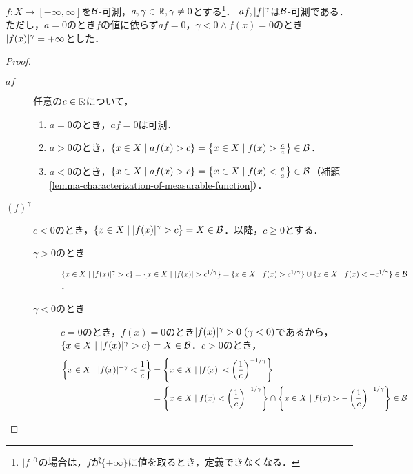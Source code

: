 \documentclass[uplatex, dvipdfmx]{jsreport}
\begin{document}
\begin{proposition}[斉次性]\label{prop-measurable-function-closed-uunder-scaling-and-power}
    $f:X\to[-\infty,\infty]$を$\mathcal{B}$-可測，$a,\gamma\in\mathbb{R},\gamma\ne 0$とする\footnote{$\lvert f\rvert^0$の場合は，$f$が$\{\pm\infty\}$に値を取るとき，定義できなくなる．}．
    $af,\lvert f\rvert^\gamma$は$\mathcal{B}$-可測である．
    ただし，$a=0$のとき$f$の値に依らず$af=0$，$\gamma<0\land f(x)=0$のとき$\lvert f(x)\rvert^\gamma=+\infty$とした．
\end{proposition}
\begin{proof}\mbox{}
    \begin{description}
        \item[$af$] 任意の$c\in\mathbb{R}$について，\begin{enumerate}
            \item $a=0$のとき，$af=0$は可測．
            \item $a>0$のとき，$\{x\in X\mid af(x)>c\}=\left\{x\in X\mid f(x)>\frac{c}{a}\right\}\in\mathcal{B}$．
            \item $a<0$のとき，$\{x\in X\mid af(x)>c\}=\left\{x\in X\mid f(x)<\frac{c}{a}\right\}\in\mathcal{B}$（補題\ref{lemma-characterization-of-measurable-function}）．
        \end{enumerate}
        \item[$(f)^\gamma$] $c<0$のとき，$\{x\in X\mid \lvert f(x)\rvert^\gamma>c\}=X\in\mathcal{B}$．以降，$c\ge 0$とする．
        \begin{description}
            \item[$\gamma>0$のとき] $\{x\in X\mid \lvert f(x)\rvert^\gamma>c\}=\{x\in X\mid \lvert f(x)\rvert>c^{1/\gamma}\}=\{x\in X\mid f(x)>c^{1/\gamma}\}\cup\{x\in X\mid f(x)<-c^{1/\gamma}\}\in\mathcal{B}$．
            \item[$\gamma<0$のとき] $c=0$のとき，$f(x)=0$のとき$\lvert f(x)\rvert^\gamma>0\;(\gamma<0)$であるから，$\{x\in X\mid \lvert f(x)\rvert^\gamma>c\}=X\in\mathcal{B}$．$c>0$のとき，
            \begin{align*}
                \left\{x\in X\mid\lvert f(x)\rvert^{-\gamma}<\frac{1}{c}\right\}&=\left\{x\in X\mid\lvert f(x)\rvert<\left(\frac{1}{c}\right)^{-1/\gamma}\right\}\\
                &=\left\{x\in X\mid f(x)<\left(\frac{1}{c}\right)^{-1/\gamma}\right\}\cap\left\{x\in X\mid f(x)>-\left(\frac{1}{c}\right)^{-1/\gamma}\right\}\in\mathcal{B}
            \end{align*}
        \end{description}
    \end{description}
\end{proof}
\end{document}
